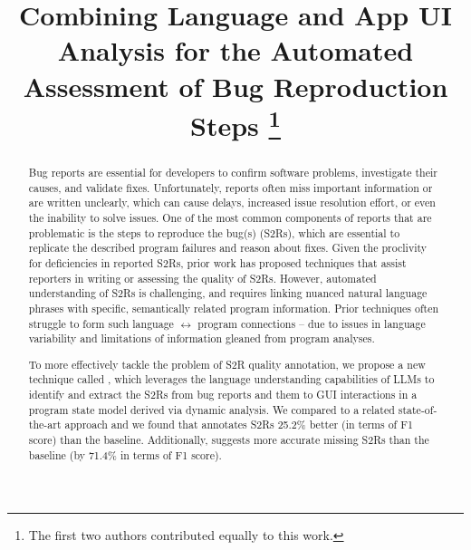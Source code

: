 \documentclass[10pt,conference]{IEEEtran}
\begin{document}
\title{Combining Language and App UI Analysis for the Automated Assessment of Bug Reproduction Steps
\thanks{The first two authors contributed equally to this work.}
}

\author{
	
}

\maketitle

\thispagestyle{plain}
\pagestyle{plain}

\begin{abstract}
Bug reports are essential for developers to confirm software problems, investigate their causes, and validate fixes. Unfortunately, reports often miss important information or are written unclearly, which can cause delays, increased issue resolution effort, or even the inability to solve issues. One of the most common components of reports that are problematic is the steps to reproduce the bug(s) (S2Rs), which are essential to replicate the described program failures and reason about fixes. Given the proclivity for deficiencies in reported S2Rs, prior work has proposed techniques that assist reporters in writing or assessing the quality of S2Rs. However, automated understanding of S2Rs is challenging, and requires linking nuanced natural language phrases with specific, semantically related program information. Prior techniques often struggle to form such language $\leftrightarrow$ program connections -- due to issues in language variability and limitations of information gleaned from program analyses. 

To more effectively tackle the problem of S2R quality annotation, we propose a new technique called \tool, which leverages the language understanding capabilities of LLMs to identify and extract the S2Rs from bug reports and  them to GUI interactions in a program state model derived via dynamic analysis. We compared \tool to a related state-of-the-art approach and we found that \tool annotates S2Rs 25.2\% better (in terms of F1 score) than the baseline. 
Additionally, \tool suggests more accurate missing S2Rs than the baseline (by 71.4\% in terms of F1 score). 
\end{abstract}
\end{document}
